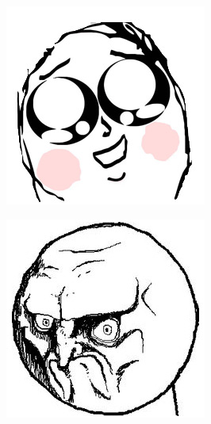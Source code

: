 \begin{multicols}{8}
\begin{center}
\includegraphics[width=\linewidth]{./IMG-GIT/MEMES/Meme-Faces-6.jpg}
\end{center}

\begin{center}
\includegraphics[width=\linewidth]{./IMG-GIT/MEMES/Meme-cara-enfadado.jpg}       
\end{center}


\end{multicols}

